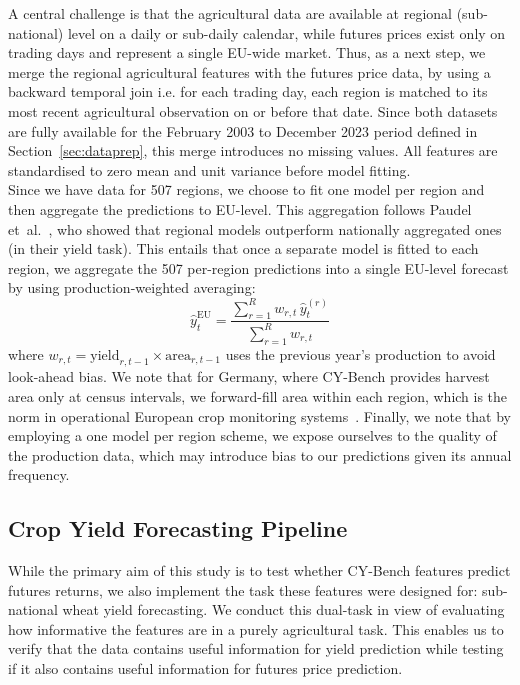 \documentclass[pdflatex,sn-mathphys-num, oneside, 11pt]{sn-jnl}%
\theoremstyle{thmstyleone}%
\theoremstyle{thmstyletwo}%
\theoremstyle{thmstylethree}%
\begin{document}
A central challenge is that the agricultural data are available at regional (sub-national) level on a daily or sub-daily calendar, while futures prices exist only on trading days and represent a single EU-wide market. Thus, as a next step, we merge the regional agricultural features with the futures price data, by using a backward temporal join i.e. for each trading day, each region is matched to its most recent agricultural observation on or before that date. Since both datasets are fully available for the February 2003 to December 2023 period defined in Section~\ref{sec:dataprep}, this merge introduces no missing values. All features are standardised to zero mean and unit variance before model fitting.\\

Since we have data for 507 regions, we choose to fit one model per region and then aggregate the predictions to EU-level. This aggregation follows Paudel et~al.~\cite{bib16}, who showed that regional models outperform nationally aggregated ones (in their yield task). This entails that once a separate model is fitted to each region, we aggregate the 507 per-region predictions into a single EU-level forecast by using production-weighted averaging:
\begin{equation}
    \hat{y}_{t}^{\text{EU}} = \frac{\sum_{r=1}^{R} w_{r,t}\, \hat{y}_{t}^{(r)}}{\sum_{r=1}^{R} w_{r,t}}
\end{equation}
where $w_{r,t} = \text{yield}_{r,t-1} \times \text{area}_{r,t-1}$ uses the previous year's production to avoid look-ahead bias. We note that for Germany, where CY-Bench provides harvest area only at census intervals, we forward-fill area within each region, which is the norm in operational European crop monitoring systems~\cite{bib_cerrani2017}. Finally, we note that by employing a one model per region scheme, we expose ourselves to the quality of the production data, which may introduce bias to our predictions given its annual frequency.

\subsection{Crop Yield Forecasting Pipeline}

While the primary aim of this study is to test whether CY-Bench features predict futures returns, we also implement the task these features were designed for: sub-national wheat yield forecasting. We conduct this dual-task in view of evaluating how informative the features are in a purely agricultural task. This enables us to verify that the data contains useful information for yield prediction while testing if it also contains useful information for futures price prediction.\\
\end{document}
